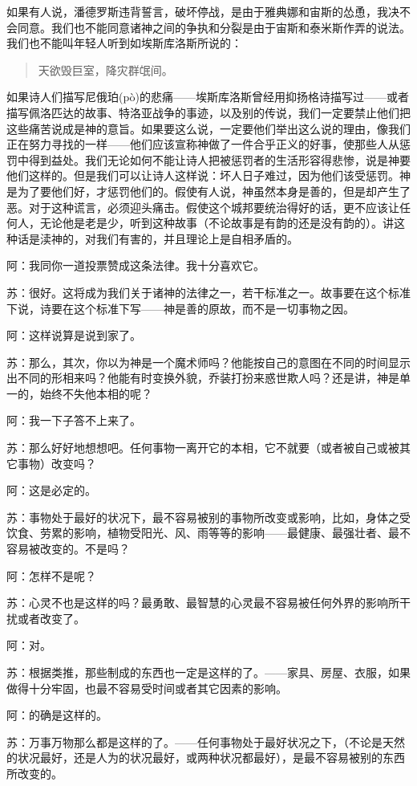 \documentclass[11pt,oneside]{book}
\begin{document}
\begin{common-format}
如果有人说，潘德罗斯违背誓言，破坏停战，是由于雅典娜和宙斯的怂恿，我决不会同意。我们也不能同意诸神之间的争执和分裂是由于宙斯和泰米斯作弄的说法。我们也不能叫年轻人听到如埃斯库洛斯所说的：
\begin{verse}
天欲毁巨室，降灾群氓间。
\end{verse}

如果诗人们描写尼俄珀(pò)的悲痛——埃斯库洛斯曾经用抑扬格诗描写过——或者描写佩洛匹达的故事、特洛亚战争的事迹，以及别的传说，我们一定要禁止他们把这些痛苦说成是神的意旨。如果要这么说，一定要他们举出这么说的理由，像我们正在努力寻找的一样——他们应该宣称神做了一件合乎正义的好事，使那些人从惩罚中得到益处。我们无论如何不能让诗人把被惩罚者的生活形容得悲惨，说是神要他们这样的。但是我们可以让诗人这样说：坏人日子难过，因为他们该受惩罚。神是为了要他们好，才惩罚他们的。假使有人说，神虽然本身是善的，但是却产生了恶。对于这种谎言，必须迎头痛击。假使这个城邦要统治得好的话，更不应该让任何人，无论他是老是少，听到这种故事（不论故事是有韵的还是没有韵的）。讲这种话是渎神的，对我们有害的，并且理论上是自相矛盾的。

阿：我同你一道投票赞成这条法律。我十分喜欢它。

苏：很好。这将成为我们关于诸神的法律之一，若干标准之一。故事要在这个标准下说，诗要在这个标准下写——神是善的原故，而不是一切事物之因。

阿：这样说算是说到家了。

苏：那么，其次，你以为神是一个魔术师吗？他能按自己的意图在不同的时间显示出不同的形相来吗？他能有时变换外貌，乔装打扮来惑世欺人吗？还是讲，神是单一的，始终不失他本相的呢？

阿：我一下子答不上来了。

苏：那么好好地想想吧。任何事物一离开它的本相，它不就要（或者被自己或被其它事物）改变吗？

阿：这是必定的。

苏：事物处于最好的状况下，最不容易被别的事物所改变或影响，比如，身体之受饮食、劳累的影响，植物受阳光、风、雨等等的影响——最健康、最强壮者、最不容易被改变的。不是吗？

阿：怎样不是呢？

苏：心灵不也是这样的吗？最勇敢、最智慧的心灵最不容易被任何外界的影响所干扰或者改变了。

阿：对。

苏：根据类推，那些制成的东西也一定是这样的了。——家具、房屋、衣服，如果做得十分牢固，也最不容易受时间或者其它因素的影响。

阿：的确是这样的。

苏：万事万物那么都是这样的了。——任何事物处于最好状况之下，（不论是天然的状况最好，还是人为的状况最好，或两种状况都最好），是最不容易被别的东西所改变的。


\end{common-format}
\end{document}
